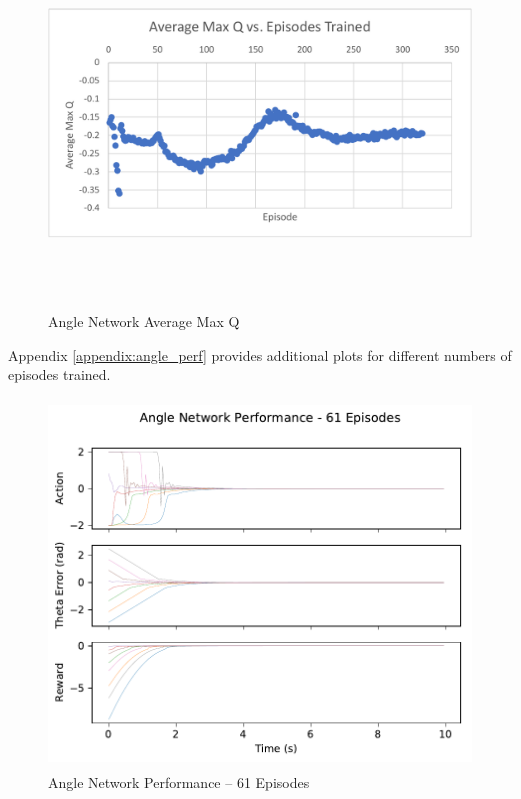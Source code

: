 \begin{figure}[H]
	\centering
	\includegraphics[width=6in, height=3.85in, keepaspectratio]{figures/train_figs/angle_q.pdf}
	\caption{Angle Network Average Max Q} \label{fig:angle_q}
\end{figure}

Appendix \ref{appendix:angle_perf} provides additional plots for different numbers of episodes trained. 
\begin{figure}[H]
	\centering
	\includegraphics[width=6in, height=3.85in, keepaspectratio]{figures/train_figs/angle_transitions/0_61.pdf}
	\caption{Angle Network Performance -- 61 Episodes}\label{fig:angle_perf}
\end{figure}

